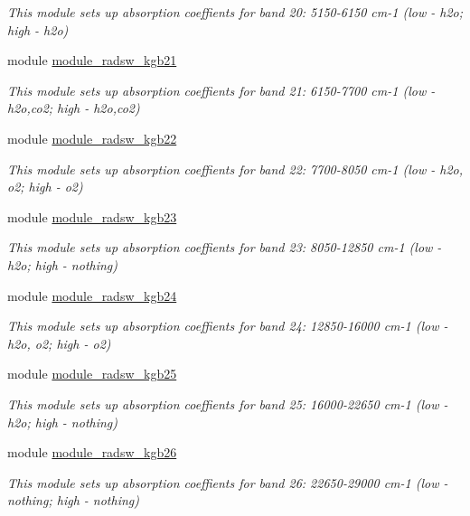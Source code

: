 \begin{DoxyCompactItemize}
\begin{DoxyCompactList}\small\item\em This module sets up absorption coeffients for band 20\+: 5150-\/6150 cm-\/1 (low -\/ h2o; high -\/ h2o) \end{DoxyCompactList}\item 
module \hyperlink{namespacemodule__radsw__kgb21}{module\+\_\+radsw\+\_\+kgb21}
\begin{DoxyCompactList}\small\item\em This module sets up absorption coeffients for band 21\+: 6150-\/7700 cm-\/1 (low -\/ h2o,co2; high -\/ h2o,co2) \end{DoxyCompactList}\item 
module \hyperlink{namespacemodule__radsw__kgb22}{module\+\_\+radsw\+\_\+kgb22}
\begin{DoxyCompactList}\small\item\em This module sets up absorption coeffients for band 22\+: 7700-\/8050 cm-\/1 (low -\/ h2o, o2; high -\/ o2) \end{DoxyCompactList}\item 
module \hyperlink{namespacemodule__radsw__kgb23}{module\+\_\+radsw\+\_\+kgb23}
\begin{DoxyCompactList}\small\item\em This module sets up absorption coeffients for band 23\+: 8050-\/12850 cm-\/1 (low -\/ h2o; high -\/ nothing) \end{DoxyCompactList}\item 
module \hyperlink{namespacemodule__radsw__kgb24}{module\+\_\+radsw\+\_\+kgb24}
\begin{DoxyCompactList}\small\item\em This module sets up absorption coeffients for band 24\+: 12850-\/16000 cm-\/1 (low -\/ h2o, o2; high -\/ o2) \end{DoxyCompactList}\item 
module \hyperlink{namespacemodule__radsw__kgb25}{module\+\_\+radsw\+\_\+kgb25}
\begin{DoxyCompactList}\small\item\em This module sets up absorption coeffients for band 25\+: 16000-\/22650 cm-\/1 (low -\/ h2o; high -\/ nothing) \end{DoxyCompactList}\item 
module \hyperlink{namespacemodule__radsw__kgb26}{module\+\_\+radsw\+\_\+kgb26}
\begin{DoxyCompactList}\small\item\em This module sets up absorption coeffients for band 26\+: 22650-\/29000 cm-\/1 (low -\/ nothing; high -\/ nothing) \end{DoxyCompactList}\item 

\end{DoxyCompactItemize}
